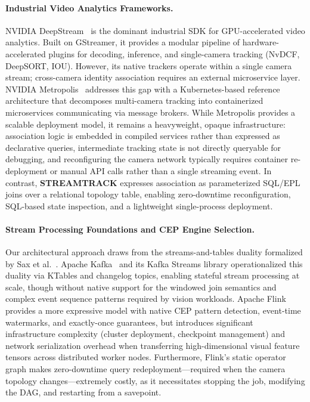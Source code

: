 \documentclass[11pt]{article}
\begin{document}
\paragraph{Industrial Video Analytics Frameworks.}
NVIDIA DeepStream~\cite{nvidia2024deepstream} is the dominant industrial SDK for GPU-accelerated video analytics. Built on GStreamer, it provides a modular pipeline of hardware-accelerated plugins for decoding, inference, and single-camera tracking (NvDCF, DeepSORT, IOU). However, its native trackers operate within a single camera stream; cross-camera identity association requires an external microservice layer. NVIDIA Metropolis~\cite{nvidia2025metropolis} addresses this gap with a Kubernetes-based reference architecture that decomposes multi-camera tracking into containerized microservices communicating via message brokers. While Metropolis provides a scalable deployment model, it remains a heavyweight, opaque infrastructure: association logic is embedded in compiled services rather than expressed as declarative queries, intermediate tracking state is not directly queryable for debugging, and reconfiguring the camera network typically requires container re-deployment or manual API calls rather than a single streaming event. In contrast, \textbf{STREAMTRACK} expresses association as parameterized SQL/EPL joins over a relational topology table, enabling zero-downtime reconfiguration, SQL-based state inspection, and a lightweight single-process deployment.

\paragraph{Stream Processing Foundations and CEP Engine Selection.}
Our architectural approach draws from the streams-and-tables duality formalized by Sax et al.~\cite{sax2018streams}. Apache Kafka~\cite{kreps2011kafka} and its Kafka Streams library operationalized this duality via KTables and changelog topics, enabling stateful stream processing at scale, though without native support for the windowed join semantics and complex event sequence patterns required by vision workloads. Apache Flink~\cite{carbone2015flink} provides a more expressive model with native CEP pattern detection, event-time watermarks, and exactly-once guarantees, but introduces significant infrastructure complexity (cluster deployment, checkpoint management) and network serialization overhead when transferring high-dimensional visual feature tensors across distributed worker nodes. Furthermore, Flink's static operator graph makes zero-downtime query redeployment---required when the camera topology changes---extremely costly, as it necessitates stopping the job, modifying the DAG, and restarting from a savepoint.
\end{document}
